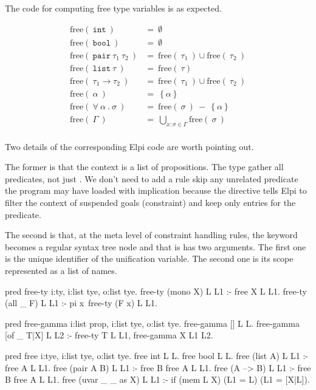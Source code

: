 \documentclass[a4paper, 11pt]{book}
\begin{document}
The code for computing free type variables is as expected.

$$
\begin{array}{ll}
  \text{free}(\ \mathtt{int}\ ) &=\ \emptyset\\
  \text{free}(\ \mathtt{bool}\ ) &=\ \emptyset\\
  \text{free}(\ \mathtt{pair}\ \tau_1\ \tau_2\ ) &=\ \text{free}(\ \tau_1\ )\cup \text{free}(\ \tau_2\ ) \\
  \text{free}(\ \mathtt{list}\ \tau\ ) &=\ \text{free}(\ \tau ) \\
  \text{free}(\ \tau_1 \to \tau_2\ ) &=\ \text{free}(\ \tau_1\ )\cup \text{free}(\ \tau_2\ ) \\
  \text{free}(\ \alpha\ ) &=\ \left\{\alpha\right\}\\
  \text{free}(\ \forall\ \alpha\ .\ \sigma\ ) &=\ \text{free}(\ \sigma\ )\  -\  \left\{\alpha\right\}\\
  \text{free}(\ \Gamma\ ) &=\ \bigcup\limits_{x:\sigma \in \Gamma}\text{free}(\ \sigma\ )\\
\end{array}
$$

Two details of the corresponding Elpi code are worth pointing out.

The former is that the context is a list of propositions. The 
type gather all predicates, not just . We don't need to add
a rule skip any unrelated predicate the program may have loaded with implication
because the  directive
tells Elpi to filter the context of suspended goals (constraint) and keep only
entries for the  predicate.

The second is that, at the meta level of constraint handling rules, the
 keyword becomes a regular syntax tree node and that is
has two arguments. The first one is the unique identifier of the unification
variable. The second one is its scope represented as a list of names.
  

\begin{elpicode}
pred free-ty i:ty, i:list tye, o:list tye.
free-ty (mono X) L L1 :- free X L L1.
free-ty (all _ F) L L1 :- pi x\ free-ty (F x) L L1.

pred free-gamma i:list prop, i:list tye, o:list tye.
free-gamma [] L L.
free-gamma [of _ T|X] L L2 :- free-ty T L L1, free-gamma X L1 L2.

pred free i:tye, i:list tye, o:list tye.
free int L L.
free bool L L.
free (list A) L L1 :- free A L L1.
free (pair A B) L L1 :- free B {free A L} L1.
free (A --> B) L L1 :- free B {free A L} L1.
free (uvar _ _ as X) L L1 :- if (mem L X) (L1 = L) (L1 = [X|L]).
\end{elpicode}
\end{document}
